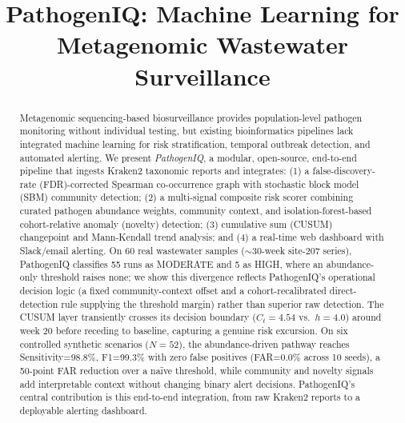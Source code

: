 \documentclass[conference]{IEEEtran}
\begin{document}
\title{PathogenIQ: Machine Learning for Metagenomic Wastewater Surveillance}

\author{
}

\maketitle

\begin{abstract}
Metagenomic sequencing-based biosurveillance provides population-level
pathogen monitoring without individual testing, but existing bioinformatics
pipelines lack integrated machine learning for risk stratification, temporal
outbreak detection, and automated alerting. We present \textit{PathogenIQ},
a modular, open-source, end-to-end pipeline that ingests Kraken2 taxonomic
reports and integrates: (1) a false-discovery-rate (FDR)-corrected Spearman
co-occurrence graph with stochastic block model (SBM) community detection;
(2) a multi-signal composite risk scorer combining curated pathogen
abundance weights, community context, and isolation-forest-based
cohort-relative anomaly (novelty) detection; (3) cumulative sum (CUSUM)
changepoint and Mann-Kendall trend analysis; and (4) a real-time web
dashboard with Slack/email alerting.
On 60 real wastewater samples ($\sim$30-week site-207 series),
PathogenIQ classifies 55 runs as MODERATE and 5 as HIGH, where an
abundance-only threshold raises none; we show this divergence reflects
PathogenIQ's operational decision logic (a fixed community-context
offset and a cohort-recalibrated direct-detection rule supplying the
threshold margin) rather than superior raw detection. The CUSUM layer
transiently crosses its decision boundary ($C_t=4.54$ vs.\ $h=4.0$) around
week 20 before receding to baseline, capturing a genuine risk excursion.
On six controlled synthetic scenarios ($N=52$), the abundance-driven
pathway reaches Sensitivity=98.8\%, F1=99.3\% with zero false positives
(FAR=0.0\% across 10 seeds), a 50-point FAR reduction over a na\"{i}ve
threshold, while community and novelty signals add interpretable context
without changing binary alert decisions. PathogenIQ's central contribution
is this end-to-end integration, from raw Kraken2 reports to a deployable
alerting dashboard.
\end{abstract}
\end{document}
